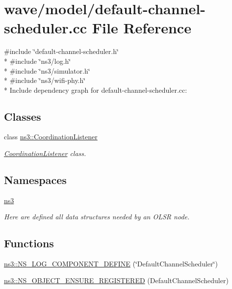 \hypertarget{default-channel-scheduler_8cc}{}\section{wave/model/default-\/channel-\/scheduler.cc File Reference}
\label{default-channel-scheduler_8cc}
{\ttfamily \#include \char`\"{}default-\/channel-\/scheduler.\+h\char`\"{}}\\*
{\ttfamily \#include \char`\"{}ns3/log.\+h\char`\"{}}\\*
{\ttfamily \#include \char`\"{}ns3/simulator.\+h\char`\"{}}\\*
{\ttfamily \#include \char`\"{}ns3/wifi-\/phy.\+h\char`\"{}}\\*
Include dependency graph for default-\/channel-\/scheduler.cc\+:
\subsection*{Classes}
\begin{DoxyCompactItemize}
\item 
class \hyperlink{classns3_1_1CoordinationListener}{ns3\+::\+Coordination\+Listener}
\begin{DoxyCompactList}\small\item\em \hyperlink{classns3_1_1CoordinationListener}{Coordination\+Listener} class. \end{DoxyCompactList}\end{DoxyCompactItemize}
\subsection*{Namespaces}
\begin{DoxyCompactItemize}
\item 
 \hyperlink{namespacens3}{ns3}
\begin{DoxyCompactList}\small\item\em Here are defined all data structures needed by an O\+L\+SR node. \end{DoxyCompactList}\end{DoxyCompactItemize}
\subsection*{Functions}
\begin{DoxyCompactItemize}
\item 
\hyperlink{namespacens3_af5fc6969a9368e60068877926e07fc57}{ns3\+::\+N\+S\+\_\+\+L\+O\+G\+\_\+\+C\+O\+M\+P\+O\+N\+E\+N\+T\+\_\+\+D\+E\+F\+I\+NE} (\char`\"{}Default\+Channel\+Scheduler\char`\"{})
\item 
\hyperlink{namespacens3_a801615b09643df222382e9bda776a2d6}{ns3\+::\+N\+S\+\_\+\+O\+B\+J\+E\+C\+T\+\_\+\+E\+N\+S\+U\+R\+E\+\_\+\+R\+E\+G\+I\+S\+T\+E\+R\+ED} (Default\+Channel\+Scheduler)
\end{DoxyCompactItemize}
